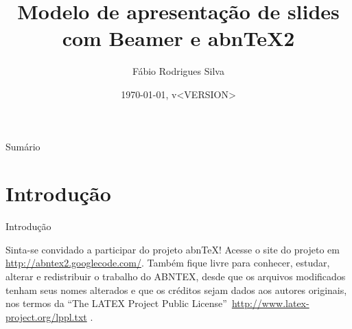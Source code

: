 \documentclass[aspectratio=169]{beamer}
\title{Modelo de apresentação de slides com Beamer e abnTeX2}
\author{Fábio Rodrigues Silva}
\institute{Universidade do Brasil
	    \par
	    Faculdade de Arquitetura da Informação}
\date{\today, v<VERSION>}
\begin{document}

\begin{frame}{Sumário}
\tableofcontents
\end{frame}

\section{Introdução}

\begin{frame}{Introdução}

Sinta-se convidado a participar do projeto abnTeX! Acesse o site do projeto em
\url{http://abntex2.googlecode.com/}. Também fique livre para conhecer,
estudar, alterar e redistribuir o trabalho do ABNTEX, desde que os arquivos
modificados tenham seus nomes alterados e que os créditos sejam dados aos
autores originais, nos termos da ``The LATEX Project Public
License''\ \url{http://www.latex-project.org/lppl.txt} \cite[p. 31]{abntex2modelo}.

\end{frame}

\end{document}

